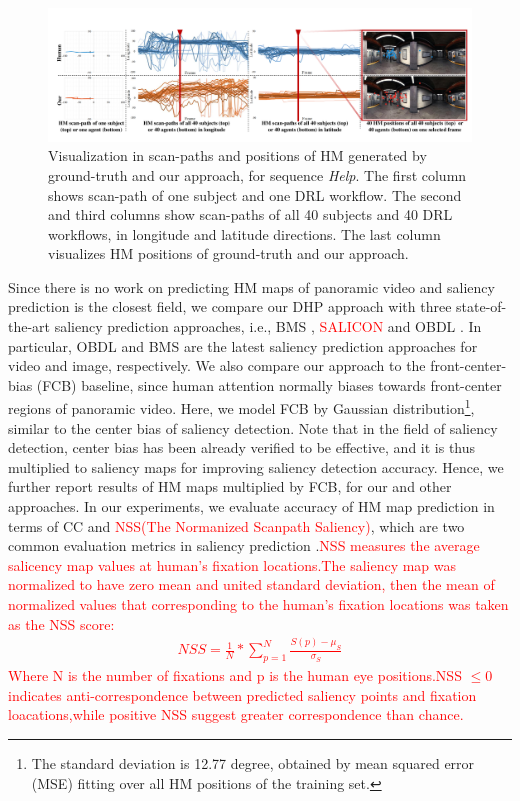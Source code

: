\documentclass[10pt,journal,compsoc]{IEEEtran}
\begin{document}
\begin{figure}
	\begin{center}
		\centerline{\includegraphics[width=2\columnwidth]{figures/experiment/scanpath_objective_result}}%
		\caption{\footnotesize{Visualization in scan-paths and positions of HM generated by ground-truth and our approach, for sequence \textit{Help}. The first column shows scan-path of one subject and one DRL workflow. The second and third columns show scan-paths of all 40 subjects and 40 DRL workflows, in longitude and latitude directions. The last column visualizes HM positions of ground-truth and our approach.}}
		\label{scan-path-example}
	\end{center}
\end{figure}
Since there is no work on predicting HM maps of panoramic video and saliency prediction is the closest field, we compare our DHP approach with three state-of-the-art saliency prediction approaches, i.e., BMS \cite{zhang2016exploiting}, \textcolor{red}{SALICON\cite{xx}} and OBDL  \cite{hossein2015many} .
In particular, OBDL  \cite{hossein2015many} and BMS \cite{zhang2016exploiting} are the latest saliency prediction approaches for video and image, respectively. We also compare our approach to the front-center-bias (FCB) baseline, since human attention normally biases towards front-center regions of panoramic video. Here, we model FCB by Gaussian distribution\footnote{The standard deviation is 12.77 degree, obtained by mean squared error (MSE) fitting over all HM positions of the training set.}, similar to the center bias of saliency detection. Note that in the field of saliency detection, center bias  \cite{borji2013state} has been already verified to be effective, and it is thus multiplied to saliency maps for improving saliency detection accuracy. Hence, we further report results of HM maps multiplied by FCB, for our and other approaches. In our experiments, we evaluate accuracy of HM map prediction in terms of CC and \textcolor{red}{NSS(The Normanized Scanpath Saliency)\cite{peters2005components}}, which are two common evaluation metrics in saliency prediction \cite{borji2013state}.\textcolor{red}{NSS measures the average salicency map values at human's fixation locations.The saliency map was normalized  to have zero mean and united standard deviation, then the mean of normalized values that corresponding to the human's fixation locations was taken as the NSS score: \begin{eqnarray}
NSS = \frac{1}{N}*\sum_{p=1}^N\frac{S(p)-\mu_S}{\sigma_S}
\end{eqnarray}
Where N is the number of fixations and p is the human eye positions.NSS $\leq 0$ indicates anti-correspondence between predicted saliency points and fixation loacations,while positive NSS suggest greater correspondence than chance.
}
\end{document}
